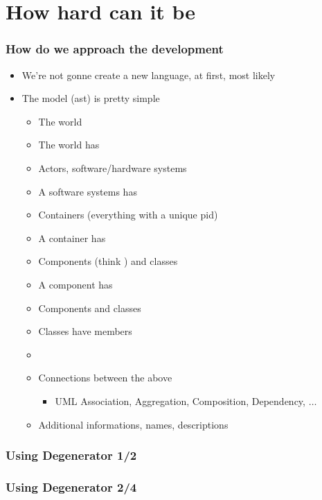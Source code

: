 \documentclass[xelatex,13pt]{beamer}
\begin{document}
\section{How hard can it be}
\begin{frame}
	\frametitle{How do we approach the development}
	\begin{itemize}
		\item We're not gonne create a new language\pause, at first\pause,
			most likely
			\pause
		\item The model (ast) is pretty simple
			\pause
		\begin{itemize}
			\item The world
			\item The world has
			\item Actors, software/hardware systems
			\item A software systems has
			\item Containers (everything with a unique pid)
			\item A container has
			\item Components (think \lstinline@module@) and classes
			\item A component has
			\item Components and classes
			\item Classes have members
			\item[]
			\item Connections between the above
			\begin{itemize}
				\item UML Association, Aggregation, Composition, Dependency, \(\dots\)
			\end{itemize}
			\item Additional informations, names, descriptions
		\end{itemize}
	\end{itemize}
\end{frame}

\begin{frame}
	\frametitle{Using Degenerator 1/2}
	
	\pause
	
\end{frame}
\begin{frame}
	\frametitle{Using Degenerator 2/4}
	
	\pause
	
\end{frame}
\end{document}
